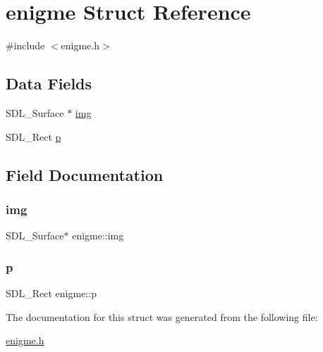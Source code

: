 \hypertarget{structenigme}{}\section{enigme Struct Reference}
\label{structenigme}


{\ttfamily \#include $<$enigme.\+h$>$}

\subsection*{Data Fields}
\begin{DoxyCompactItemize}
\item 
S\+D\+L\+\_\+\+Surface $\ast$ \hyperlink{structenigme_ac5c2141e5f8c366ff16d1fad83ee3e54}{img}
\item 
S\+D\+L\+\_\+\+Rect \hyperlink{structenigme_a1ecc3fa572d2c308e1aecacf74fd1ec0}{p}
\end{DoxyCompactItemize}


\subsection{Field Documentation}
\mbox{\label{structenigme_ac5c2141e5f8c366ff16d1fad83ee3e54}} 
\subsubsection{\texorpdfstring{img}{img}}
{\footnotesize\ttfamily S\+D\+L\+\_\+\+Surface$\ast$ enigme\+::img}

\mbox{\label{structenigme_a1ecc3fa572d2c308e1aecacf74fd1ec0}} 
\subsubsection{\texorpdfstring{p}{p}}
{\footnotesize\ttfamily S\+D\+L\+\_\+\+Rect enigme\+::p}



The documentation for this struct was generated from the following file\+:\begin{DoxyCompactItemize}
\item 
\hyperlink{enigme_8h}{enigme.\+h}\end{DoxyCompactItemize}

